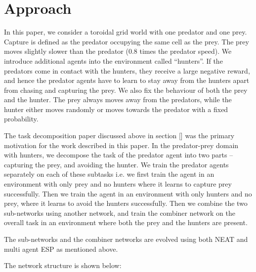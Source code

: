 \section{Approach}
\label{sec:approach}
In this paper, we consider a toroidal grid world with one predator and one prey. Capture is defined as the predator occupying the same cell as the prey. The prey moves slightly slower than the predator (0.8 times the predator speed). We introduce additional agents into the environment called “hunters”. If the predators come in contact with the hunters, they receive a large negative reward, and hence the predator agents have to learn to stay away from the hunters apart from chasing and capturing the prey. We also fix the behaviour of both the prey and the hunter. The prey always moves away from the predators, while the hunter either moves randomly or moves towards the predator with a fixed probability.

The task decomposition paper discussed above in section []  was the primary
motivation for the work described in this paper. In the predator-prey domain
with hunters, we decompose the task of the predator agent into two parts --
capturing the prey, and avoiding the hunter. We train the predator agents
separately on each of these subtasks i.e. we first train the agent in an environment with only prey and no hunters where it learns to capture prey successfully. Then we train the agent in an environment with only hunters and no prey, where it learns to avoid the hunters successfully. Then we combine the two sub-networks using another network, and train the combiner network on the overall task in an environment where both the prey and the hunters are present. 

The sub-networks and the combiner networks are evolved using both NEAT and multi agent ESP as mentioned above.

The network structure is shown below:
